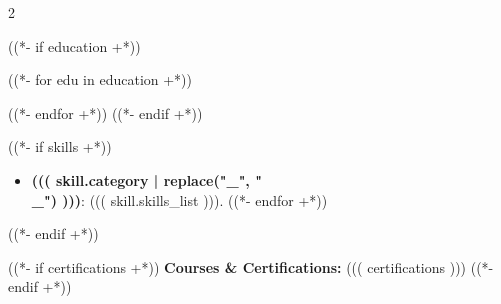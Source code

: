 \documentclass[10pt,a4paper,ragged2e,withhyper]{altacv}
\begin{document}
\begin{paracol}{2}

((*- if education +*))

((*- for edu in education +*))

((*- endfor +*))
((*- endif +*))

\switchcolumn

((*- if skills +*))
\begin{itemize}
((*- for skill in skills +*))
    \item \textbf{((( skill.category | replace("_", "\\_") )))}: ((( skill.skills_list ))).
((*- endfor +*))
\end{itemize}
((*- endif +*))

\end{paracol}

((*- if certifications +*))
\vspace{0.2cm}
{\large\color{black}\textbf{Courses \& Certifications:}}
((( certifications )))
((*- endif +*))
\end{document}
